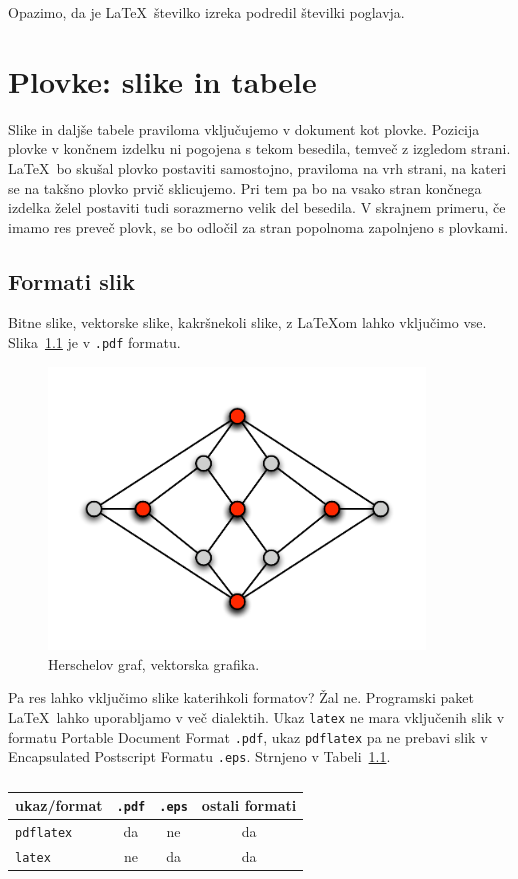\documentclass[a4paper, 12pt]{book}
\begin{document}
Opazimo, da je \LaTeX\ številko izreka podredil številki poglavja.


\chapter{Plovke: slike in tabele}
\label{ch2}
Slike in daljše tabele praviloma vključujemo v dokument kot plovke. Pozicija plovke v končnem izdelku ni pogojena s tekom besedila, temveč z izgledom strani. \LaTeX\ bo skušal plovko postaviti samostojno, praviloma na vrh strani, na kateri se na takšno plovko prvič sklicujemo. Pri tem pa bo na vsako stran končnega izdelka želel postaviti tudi sorazmerno velik del besedila. V skrajnem primeru, če imamo res preveč plovk, se bo odločil za stran popolnoma zapolnjeno s plovkami.

\section{Formati slik}
Bitne slike, vektorske slike, kakršnekoli slike, z \LaTeX{}om lahko vključimo vse.
Slika~\ref{pic1} je v {\tt .pdf} formatu.
\begin{figure}
    \begin{center}
        \includegraphics[width=10cm]{pic1.pdf}
    \end{center}
\caption{Herschelov graf, vektorska grafika.}
\label{pic1}
\end{figure}
Pa res lahko vključimo slike katerihkoli formatov? Žal ne. Programski paket \LaTeX\ lahko uporabljamo v več dialektih. Ukaz {\tt latex} ne mara vključenih slik v formatu Portable Document Format {\tt .pdf}, ukaz {\tt pdflatex} pa ne prebavi slik v Encapsulated Postscript Formatu {\tt .eps}.
Strnjeno v Tabeli~\ref{tbl:1}.

\begin{table}
    \begin{center}
        \begin{tabular}{l|ccc}
            ukaz/format & {\tt .pdf} & {\tt .eps} & ostali formati \\ \hline
                        {\tt pdflatex} & da & ne & da \\
                        {\tt latex}   & ne & da  & da
        \end{tabular}
    \end{center}
\caption{}
\label{tbl:1}
\end{table}
\end{document}

